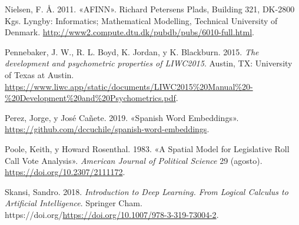 \documentclass[
  12pt,
]{article}
\newlength{\cslhangindent}
\newlength{\cslentryspacingunit} %
\newenvironment{CSLReferences}[2] %
 {%
  \setlength{\parindent}{0pt}
  \ifodd #1
  \let\oldpar\par
  \def\par{\hangindent=\cslhangindent\oldpar}
  \fi
  \setlength{\parskip}{#2\cslentryspacingunit}
 }%
 {}
\begin{document}
\begin{CSLReferences}{1}{0}
\leavevmode{}%
Nielsen, F. Å. 2011. {«AFINN»}. Richard Petersens Plads, Building 321,
{DK-}2800 Kgs. Lyngby: Informatics; Mathematical Modelling, Technical
University of Denmark.
\url{http://www2.compute.dtu.dk/pubdb/pubs/6010-full.html}.

\leavevmode{}%
Pennebaker, J. W., R. L. Boyd, K. Jordan, y K. Blackburn. 2015.
\emph{The development and psychometric properties of LIWC2015}. Austin,
TX: University of Texas at Austin.
\url{https://www.liwc.app/static/documents/LIWC2015\%20Manual\%20-\%20Development\%20and\%20Psychometrics.pdf}.

\leavevmode{}%
Perez, Jorge, y José Cañete. 2019. {«Spanish Word Embeddings»}.
\url{https://github.com/dccuchile/spanish-word-embeddings}.

\leavevmode{}%
Poole, Keith, y Howard Rosenthal. 1983. {«A Spatial Model for
Legislative Roll Call Vote Analysis»}. \emph{American Journal of
Political Science} 29 (agosto). \url{https://doi.org/10.2307/2111172}.

\leavevmode{}%
Skansi, Sandro. 2018. \emph{Introduction to Deep Learning. From Logical
Calculus to Artificial Intelligence}. Springer Cham.
https://doi.org/\url{https://doi.org/10.1007/978-3-319-73004-2}.

\end{CSLReferences}
\end{document}
